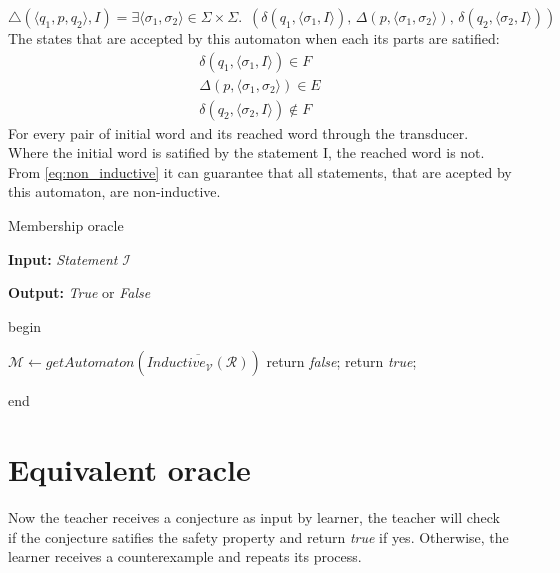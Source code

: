 \begin{equation*}
    \triangle(\langle q_1, p, q_2 \rangle, I) =  \exists \langle \sigma_1, \sigma_2 \rangle \in \Sigma \times \Sigma. \,\,\,
    (\delta(q_1, \langle \sigma_1, I \rangle) ,\, \Delta(p, \langle \sigma_1, \sigma_2 \rangle) ,\, \delta(q_2, \langle \sigma_2, I \rangle))
\end{equation*}
The states that are accepted by this automaton when each its parts are satified: 
\begin{align*} 
    \delta(q_1, \langle \sigma_1, I \rangle) \in  F \\
    \Delta(p, \langle \sigma_1, \sigma_2 \rangle) \in E \\
    \delta(q_2, \langle \sigma_2, I \rangle) \notin  F
\end{align*}
For every pair of initial word and its reached word through the transducer.
Where the initial word is satified by the statement I, the reached word is not.
From \ref{eq:non_inductive} it can guarantee that all statements, that are acepted by this automaton, are non-inductive.
\begin{algorithm}
\caption{Membership oracle}\label{alg:membership}
\textbf{Input: } \textit{Statement} $\mathcal{I}$ 

\textbf{Output: } \textit{True} or \textit{False}

begin
\begin{algorithmic}[1]
    \State $\mathcal{M} \gets getAutomaton(\overline{Inductive_{\mathcal{V}}(\mathcal{R})})$
        \State return \textit{false};
    \Else
        \State return \textit{true};
    \EndIf
\end{algorithmic}
end
\end{algorithm}
\section{Equivalent oracle}
Now the teacher receives a conjecture as input by learner, the teacher will check if
the conjecture satifies the safety property and return \textit{true} if yes. 
Otherwise, the learner receives a counterexample and repeats its process.

